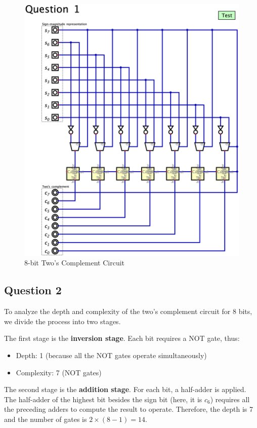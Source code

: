 \documentclass[conference]{IEEEtran}
\begin{document}
\begin{figure}[h!]
\centering
\includegraphics[width=\textwidth]{assets/twos_complement.png}
\caption{8-bit Two's Complement Circuit}
\label{fig:twos_complement}
\end{figure}


\subsection{Question 2}

To analyze the depth and complexity of the two's complement circuit for 8 bits, we divide the process into two stages.

The first stage is the \textbf{inversion stage}. Each bit requires a NOT gate, thus:
\begin{itemize}
\item Depth: 1 (because all the NOT gates operate simultaneously)
\item Complexity: 7 (NOT gates)
\end{itemize}

The second stage is the \textbf{addition stage}. For each bit, a half-adder is applied.
The half-adder of the highest bit besides the sign bit (here, it is $c_6$) requires all the preceding adders to compute the result to operate.
Therefore, the depth is 7 and the number of gates is $2 \times (8 - 1) = 14$.
\end{document}
